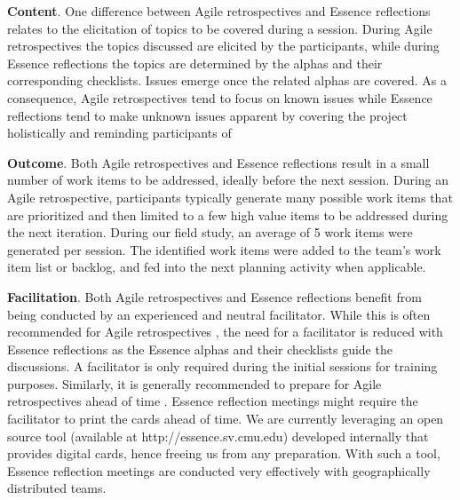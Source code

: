 \textbf{Content}. One difference between Agile retrospectives and Essence reflections relates to the elicitation of topics to be covered during a session. During Agile retrospectives the topics discussed are elicited by the participants, while during Essence reflections the topics are determined by the alphas and their corresponding checklists. Issues emerge once the related alphas are covered. As a consequence, Agile retrospectives tend to focus on known issues while Essence reflections tend to make unknown issues apparent by covering the project holistically and reminding participants of 

\textbf{Outcome}. Both Agile retrospectives and Essence reflections result in a small number of work items to be addressed, ideally before the next session. During an Agile retrospective, participants typically generate many possible work items that are prioritized and then limited to a few high value items to be addressed during the next iteration. During our field study, an average of 5 work items were generated per session. The identified work items were added to the team's work item list or backlog, and fed into the next planning activity when applicable.

\textbf{Facilitation}. Both Agile retrospectives and Essence reflections benefit from being conducted by an experienced and neutral facilitator. While this is often recommended for Agile retrospectives \cite{KuaRetrospectiveHandbook}, the need for a facilitator is reduced with Essence reflections as the Essence alphas and their checklists guide the discussions. A facilitator is only required during the initial sessions for training purposes. Similarly, it is generally recommended to prepare for Agile retrospectives ahead of time \cite{Derby2006, KuaRetrospectiveHandbook}. Essence reflection meetings might require the facilitator to print the cards ahead of time. We are currently leveraging an open source tool (available at http://essence.sv.cmu.edu) developed internally that provides digital cards, hence freeing us from any preparation. With such a tool, Essence reflection meetings are conducted very effectively with geographically distributed teams.

